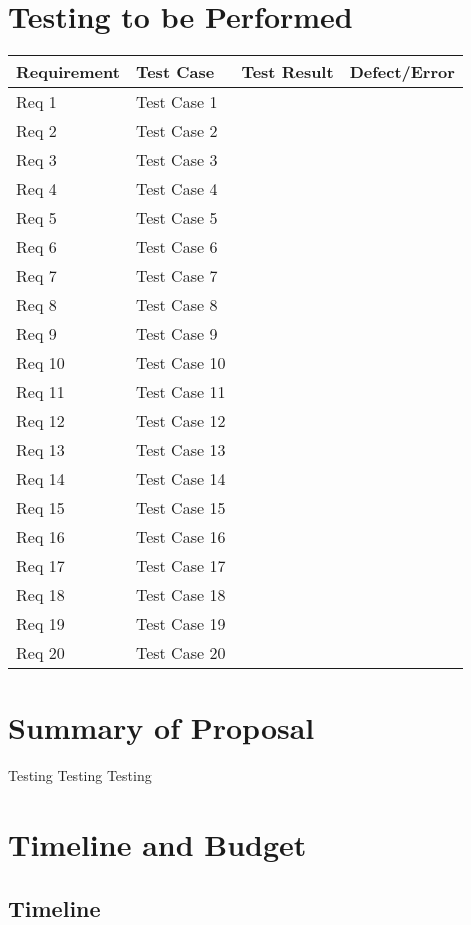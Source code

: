 \documentclass{report}
\begin{document}
\chapter{Testing to be Performed}
\begin{tabular}{|l|l|l|l|}
\hline
Requirement & Test Case & Test Result & Defect/Error \\
\hline
Req 1 & Test Case 1 &  &  \\
\hline
Req 2 & Test Case 2 &  &  \\
\hline
Req 3 & Test Case 3 &  &  \\
\hline
Req 4 & Test Case 4 &  &  \\
\hline
Req 5 & Test Case 5 &  &  \\
\hline
Req 6 & Test Case 6 &  &  \\
\hline
Req 7 & Test Case 7 &  &  \\
\hline
Req 8 & Test Case 8 &  &  \\
\hline
Req 9 & Test Case 9 &  &  \\
\hline
Req 10 & Test Case 10 &  &  \\
\hline
Req 11 & Test Case 11 &  &  \\
\hline
Req 12 & Test Case 12 &  &  \\
\hline
Req 13 & Test Case 13 &  &  \\
\hline
Req 14 & Test Case 14 &  &  \\
\hline
Req 15 & Test Case 15 &  &  \\
\hline
Req 16 & Test Case 16 &  &  \\
\hline
Req 17 & Test Case 17 &  &  \\
\hline
Req 18 & Test Case 18 &  &  \\
\hline
Req 19 & Test Case 19 &  &  \\
\hline
Req 20 & Test Case 20 &  &  \\
\hline
\end{tabular}

\chapter{Summary of Proposal}
Testing Testing Testing

\chapter{Timeline and Budget}
\section{Timeline}
\end{document}
